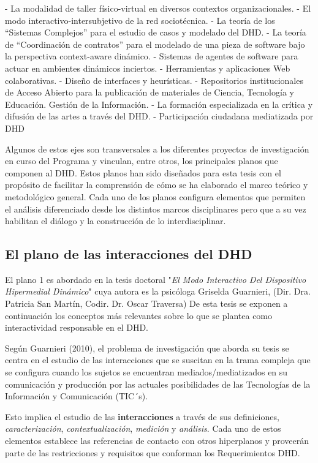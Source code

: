 - La modalidad de taller físico-virtual en diversos contextos organizacionales.
- El modo interactivo-intersubjetivo de la red sociotécnica.
- La teoría de los “Sistemas Complejos” para el estudio de casos y modelado del DHD.
- La teoría de “Coordinación de contratos” para el modelado de una pieza de software bajo la perspectiva context-aware dinámico.
- Sistemas de agentes de software para actuar en ambientes dinámicos inciertos.
- Herramientas y aplicaciones Web colaborativas.
- Diseño de interfaces y heurísticas.
- Repositorios institucionales de Acceso Abierto para la publicación de materiales de Ciencia, Tecnología y Educación. Gestión de la Información.
- La formación especializada en la crítica y difusión de las artes a través del DHD.
- Participación ciudadana mediatizada por DHD

Algunos de estos ejes son transversales a los diferentes proyectos de investigación en curso del Programa y vinculan,
entre otros, los principales planos que componen al DHD. Estos planos han sido diseñados para esta tesis con el propósito de facilitar la comprensión de cómo se ha elaborado el marco teórico y metodológico general. Cada uno de los planos configura
elementos que permiten el análisis diferenciado desde los distintos marcos disciplinares pero que a su vez habilitan el diálogo y la construcción de lo interdisciplinar. 

\subsection{El plano de las interacciones del DHD} \label{interacciones}

El plano 1 es abordado en la tesis doctoral "\textit{El Modo Interactivo Del
Dispositivo Hipermedial Dinámico}" cuya autora es la psicóloga Griselda Guarnieri,
(Dir. Dra. Patricia San Martín, Codir. Dr. Oscar Traversa) De esta tesis se exponen a continuación los
conceptos más relevantes sobre lo que se plantea como interactividad responsable en el DHD.

Según Guarnieri (2010), el problema de investigación que aborda su tesis se centra en el estudio de las
interacciones que se suscitan en la trama compleja que se configura cuando los
sujetos se encuentran mediados/mediatizados en su comunicación y producción por
las actuales posibilidades de las Tecnologías de la Información y Comunicación
(TIC´s). 

Esto implica el estudio de las \textbf{interacciones} a través de sus definiciones,
 \textit{caracterización}, \textit{contextualización}, \textit{medición} y
\textit{análisis}. Cada uno de estos elementos establece las referencias de
contacto con otros hiperplanos y proveerán parte de las restricciones y
requisitos que conforman los Requerimientos DHD.

